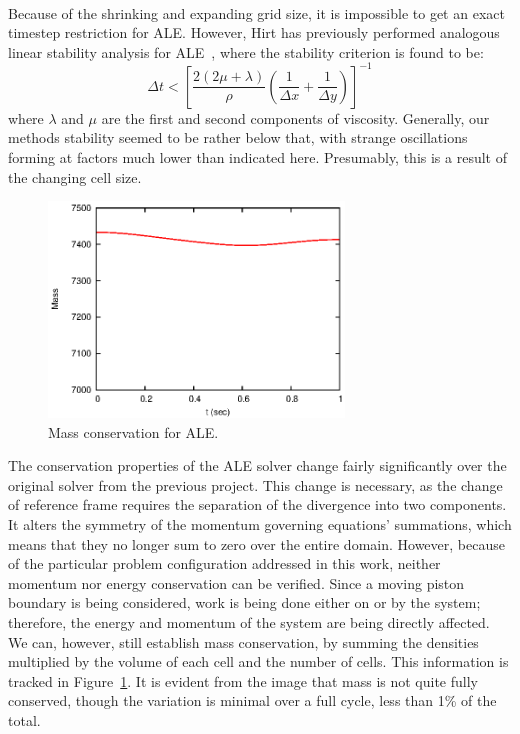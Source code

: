 \documentclass{article}
\begin{document}
\\
Because of the shrinking and expanding grid size, it is impossible to get an exact timestep restriction for ALE.  However, Hirt has previously performed analogous linear stability analysis for ALE~\cite{hirt74}, where the stability criterion is found to be:
\begin{equation}
  \Delta t < \left[ \frac{2(2\mu + \lambda)}{\rho}\left(\frac{1}{\Delta x} + \frac{1}{\Delta y}\right)\right]^{-1}
\end{equation}
where $\lambda$ and $\mu$ are the first and second components of viscosity.  Generally, our methods stability seemed to be rather below that, with strange oscillations forming at factors much lower than indicated here.  Presumably, this is a result of the changing cell size.
\\  
\begin{figure}
  \centering
  \includegraphics[width=0.7\textwidth]{massconsALE.eps}         
  \caption{Mass conservation for ALE.}
  \label{fig:massconsALE}
\end{figure}
The conservation properties of the ALE solver change fairly significantly over the original solver from the previous project.  This change is necessary, as the change of reference frame requires the separation of the divergence into two components.  It alters the symmetry of the momentum governing equations' summations, which means that they no longer sum to zero over the entire domain.  However, because of the particular problem configuration addressed in this work, neither momentum nor energy conservation can be verified.  Since a moving piston boundary is being considered, work is being done either on or by the system; therefore, the energy and momentum of the system are being directly affected.  We can, however, still establish mass conservation, by summing the densities multiplied by the volume of each cell and the number of cells.  This information is tracked in Figure~\ref{fig:massconsALE}.  It is evident from the image that mass is not quite fully conserved, though the variation is minimal over a full cycle, less than 1\% of the total.  
\end{document}
